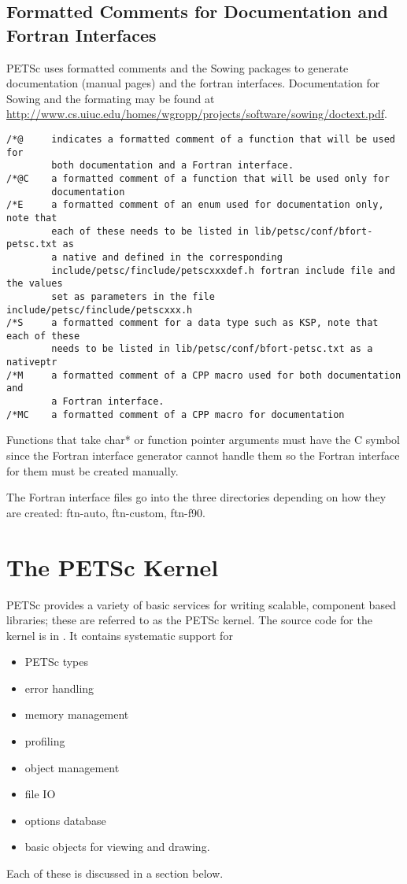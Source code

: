\documentclass[twoside,12pt]{../sty/report_petsc}
\begin{document}
\section{Formatted Comments for Documentation and Fortran Interfaces}

PETSc uses formatted comments and the Sowing packages to generate documentation (manual pages) and the fortran interfaces. Documentation for Sowing and the formating may be found at \href{http://www.cs.uiuc.edu/homes/wgropp/projects/software/sowing/doctext.pdf}{http://www.cs.uiuc.edu/homes/wgropp/projects/software/sowing/doctext.pdf}.

\begin{verbatim}
/*@     indicates a formatted comment of a function that will be used for
        both documentation and a Fortran interface.
/*@C    a formatted comment of a function that will be used only for
        documentation
/*E     a formatted comment of an enum used for documentation only, note that
        each of these needs to be listed in lib/petsc/conf/bfort-petsc.txt as
        a native and defined in the corresponding
        include/petsc/finclude/petscxxxdef.h fortran include file and the values
        set as parameters in the file include/petsc/finclude/petscxxx.h
/*S     a formatted comment for a data type such as KSP, note that each of these
        needs to be listed in lib/petsc/conf/bfort-petsc.txt as a nativeptr
/*M     a formatted comment of a CPP macro used for both documentation and
        a Fortran interface.
/*MC    a formatted comment of a CPP macro for documentation
\end{verbatim}

Functions that take char* or function pointer arguments must have the C symbol since the Fortran interface generator cannot handle them so the Fortran interface for them must be created manually.

The Fortran interface files go into the three directories depending on how they are created: ftn-auto, ftn-custom, ftn-f90.

\chapter{The PETSc Kernel}
\label{chapter:kernel}
PETSc provides a variety of basic services for writing scalable, component
based libraries; these are referred to as the PETSc kernel. The source
code for the kernel is in . It contains systematic support for
\begin{itemize}
  \item PETSc types
  \item error handling
  \item memory management
  \item profiling
  \item object management
  \item file IO
  \item options database
  \item basic objects for viewing and drawing.
\end{itemize}
Each of these is discussed in a section below.
\end{document}
